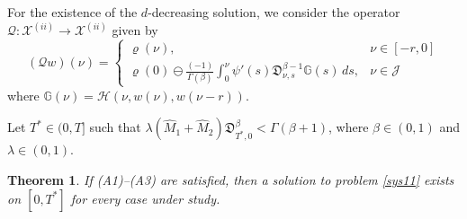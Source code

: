 \documentclass[10pt,a4paper]{amsart}
\numberwithin{equation}{section}
\newtheorem{theorem}[theo]{Theorem}
\begin{document}
For the existence of the $d$-decreasing solution, we consider the operator
 $\mathcal{Q}: \mathcal{X}^{(ii)} \to \mathcal{X}^{(ii)}$ given by
\begin{equation} \label{sys32}
(\mathcal{Q} w)(\nu )=\begin{cases}
\varrho(\nu ), & \nu \in[- r, 0]  \\
\varrho(0) \ominus \frac{(-1)}{\Gamma(\beta)} \int_0^{\nu }
\psi'(s)\mathfrak{D}_{\nu ,s}^{\beta-1} \mathbb{G}(s)\,ds, & \nu \in\mathcal{J}
\end{cases}
\end{equation}
where $\mathbb{G}(\nu )=\mathcal{H}(\nu , w(\nu ), w(\nu - r))$.

Let $T^{*} \in (0,T]$ such that
$\lambda(\hat{M}_{1}+\hat{M}_{2})\mathfrak{D}_{T^{*},0}^{\beta}<\Gamma(\beta+1)$, 
where $\beta \in(0,1)$ and $\lambda \in(0,1)$.

\begin{theorem} \label{thm3.1}
If {\rm (A1)--(A3)} are satisfied, then a solution to problem \eqref{sys11} 
exists on \([0, T^*]\) for every case under study.
\end{theorem}
\end{document}
